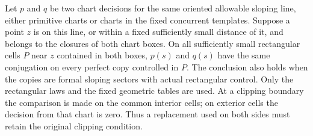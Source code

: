 \begin{lemma}\label{lem:line-slide}
Let $p$ and $q$ be two chart decisions for the same oriented allowable
sloping line, either primitive charts or charts in the fixed
concurrent templates.  Suppose a point $z$ is on this line, or within
a fixed sufficiently small distance of it, and belongs to the
closures of both chart boxes.  On all sufficiently small rectangular
cells $P$ near $z$ contained in both boxes, $p(s)$ and $q(s)$ have the same
conjugation on every perfect copy controlled in $P$.  The conclusion
also holds when the copies are formal sloping sectors with actual
rectangular control.  Only the rectangular laws and the fixed
geometric tables are used.  At a clipping boundary the comparison is
made on the common interior cells; on exterior cells the decision
from that chart is zero.  Thus a replacement used on both sides must
retain the original clipping condition.
\end{lemma}

